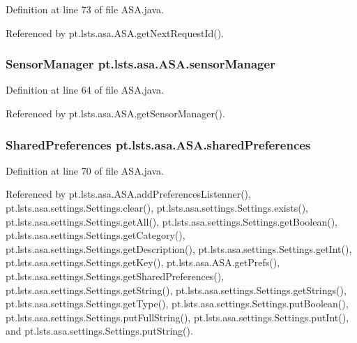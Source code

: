 Definition at line 73 of file A\+S\+A.\+java.



Referenced by pt.\+lsts.\+asa.\+A\+S\+A.\+get\+Next\+Request\+Id().

\hypertarget{classpt_1_1lsts_1_1asa_1_1ASA_a4eb3c4a73c2c1631c94574384f6323e2}{}
\subsubsection[{sensor\+Manager}]{\setlength{\rightskip}{0pt plus 5cm}Sensor\+Manager pt.\+lsts.\+asa.\+A\+S\+A.\+sensor\+Manager\hspace{0.3cm}{\ttfamily [static]}}\label{classpt_1_1lsts_1_1asa_1_1ASA_a4eb3c4a73c2c1631c94574384f6323e2}


Definition at line 64 of file A\+S\+A.\+java.



Referenced by pt.\+lsts.\+asa.\+A\+S\+A.\+get\+Sensor\+Manager().

\hypertarget{classpt_1_1lsts_1_1asa_1_1ASA_a7ba8cb6b6565d074dce7b016da83d1ba}{}
\subsubsection[{shared\+Preferences}]{\setlength{\rightskip}{0pt plus 5cm}Shared\+Preferences pt.\+lsts.\+asa.\+A\+S\+A.\+shared\+Preferences}\label{classpt_1_1lsts_1_1asa_1_1ASA_a7ba8cb6b6565d074dce7b016da83d1ba}


Definition at line 70 of file A\+S\+A.\+java.



Referenced by pt.\+lsts.\+asa.\+A\+S\+A.\+add\+Preferences\+Listenner(), pt.\+lsts.\+asa.\+settings.\+Settings.\+clear(), pt.\+lsts.\+asa.\+settings.\+Settings.\+exists(), pt.\+lsts.\+asa.\+settings.\+Settings.\+get\+All(), pt.\+lsts.\+asa.\+settings.\+Settings.\+get\+Boolean(), pt.\+lsts.\+asa.\+settings.\+Settings.\+get\+Category(), pt.\+lsts.\+asa.\+settings.\+Settings.\+get\+Description(), pt.\+lsts.\+asa.\+settings.\+Settings.\+get\+Int(), pt.\+lsts.\+asa.\+settings.\+Settings.\+get\+Key(), pt.\+lsts.\+asa.\+A\+S\+A.\+get\+Prefs(), pt.\+lsts.\+asa.\+settings.\+Settings.\+get\+Shared\+Preferences(), pt.\+lsts.\+asa.\+settings.\+Settings.\+get\+String(), pt.\+lsts.\+asa.\+settings.\+Settings.\+get\+Strings(), pt.\+lsts.\+asa.\+settings.\+Settings.\+get\+Type(), pt.\+lsts.\+asa.\+settings.\+Settings.\+put\+Boolean(), pt.\+lsts.\+asa.\+settings.\+Settings.\+put\+Full\+String(), pt.\+lsts.\+asa.\+settings.\+Settings.\+put\+Int(), and pt.\+lsts.\+asa.\+settings.\+Settings.\+put\+String().

